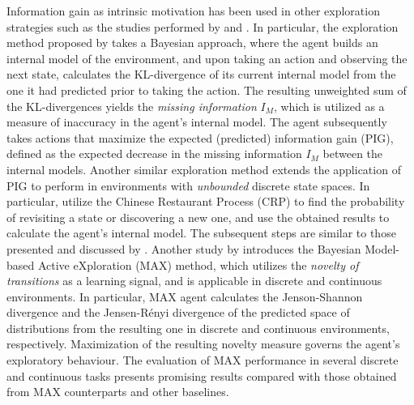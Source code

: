 Information gain as intrinsic motivation has been used in other exploration strategies such as the studies performed by  and . In particular, the exploration method proposed by  takes a Bayesian approach, where the agent builds an internal model of the environment, and upon taking an action and observing the next state, calculates the KL-divergence of its current internal model from the one it had predicted prior to taking the action. The resulting unweighted sum of the KL-divergences yields the \emph{missing information} $I_M$, which is utilized as a measure of inaccuracy in the agent’s internal model. The agent subsequently takes actions that maximize the expected (predicted) information gain (PIG), defined as the expected decrease in the missing information $I_M$ between the internal models.  Another similar exploration method  extends the application of PIG  to perform in environments with \emph{unbounded} discrete state spaces. In particular,  utilize the Chinese Restaurant Process (CRP) to find the probability of revisiting a state or discovering a new one, and use the obtained results to calculate the agent’s internal model. The subsequent steps are similar to those presented and discussed by . Another study by  introduces the Bayesian Model-based Active eXploration (MAX) method, which utilizes the \emph{novelty of transitions} as a learning signal, and is applicable in discrete and continuous environments. In particular, MAX agent calculates the Jenson-Shannon divergence and the Jensen-R\'enyi divergence  of the predicted space of distributions from the resulting one in discrete and continuous environments, respectively. Maximization of the resulting novelty measure governs the agent’s exploratory behaviour. The evaluation of MAX performance in several discrete and continuous tasks presents promising results compared with those obtained from MAX counterparts and other baselines.
